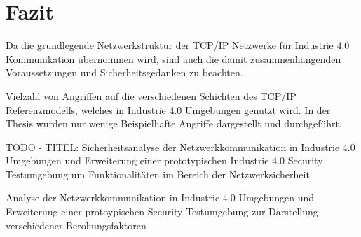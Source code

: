 \chapter{Fazit}
Da die grundlegende Netzwerkstruktur der \ac{TCP}/\ac{IP} Netzwerke für Industrie 4.0 Kommunikation übernommen wird, sind auch die damit zusammenhängenden Voraussetzungen und Sicherheitsgedanken zu beachten. \cite{sichKom2017}

Vielzahl von Angriffen auf die verschiedenen Schichten des \ac{TCP}/\ac{IP} Referenzmodells, welches in Industrie 4.0 Umgebungen genutzt wird.
In der Thesis wurden nur wenige Beispielhafte Angriffe dargestellt und durchgeführt.


TODO - TITEL:
Sicherheitsanalyse der Netzwerkkommunikation in Industrie 4.0 Umgebungen und Erweiterung einer prototypischen Industrie 4.0 Security Testumgebung um Funktionalitäten im Bereich der Netzwerksicherheit

Analyse der Netzwerkkommunikation in Industrie 4.0 Umgebungen und Erweiterung einer protoypischen Security Testumgebung zur Darstellung verschiedener Berohungsfaktoren